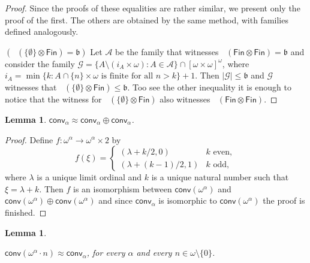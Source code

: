 \documentclass{amsart}
\theoremstyle{plain}
\newtheorem{lemma}[theorem]{Lemma}
\theoremstyle{definition}
\theoremstyle{remark}
\newcommand{\cA}{\mathcal{A}}
\newcommand{\cG}{\mathcal{G}}
\newcommand{\bnumber}{\mathfrak{b}}
\DeclareMathOperator{\add}{add}
\DeclareMathOperator{\addo}{\add^*_{\omega}}
\newcommand{\FIN}{\mathsf{Fin}}
\newcommand{\fin}{\FIN}
\newcommand{\conv}{\mathsf{conv}}
\begin{document}
\begin{proof}
   
    Since the proofs of these equalities are rather similar, we present only the proof of the first. The others are obtained by the same method, with families defined analogously.
    
   $(\addo(\{\emptyset\}\otimes\fin)= \bnumber)$ Let $\cA$ be the family that witnesses $\addo(\fin\otimes\fin)= \bnumber$ and consider the family $\cG=\{A\setminus (i_A\times \omega) : A\in\cA \}\cap [\omega\times \omega]^\omega$, where $i_A=\min\{k: A\cap \{n\}\times\omega \text{ is finite for all } n>k\}+1$. Then $|\cG|\leq \bnumber$ and $\cG$ witnesses that $\addo(\{\emptyset\}\otimes\fin)\leq \bnumber$. Too see the other inequality it is enough to notice that the witness for $\addo(\{\emptyset\}\otimes\fin)$ also witnesses $\addo(\fin\otimes\fin)$.
\end{proof}


\begin{lemma}\label{lem:baufa}
$\conv_\alpha\approx \conv_\alpha\oplus\conv_\alpha$.
\end{lemma}
\begin{proof}
Define $f:\omega^\alpha\to \omega^\alpha\times 2$ by 
    \begin{equation*}
f(\xi)=
\begin{cases}
(\lambda+k/2,0) & k \text{ even},\\
(\lambda+(k-1)/2,1) & k \text{ odd},
    \end{cases}
\end{equation*}
where 
 $\lambda$ is 
  a unique limit ordinal and $k$ is a unique natural number  such that $\xi=\lambda+k$. 
Then $f$ is an isomorphism between $\conv(\omega^\alpha)$ and $\conv(\omega^\alpha)\oplus\conv(\omega^\alpha)$ and since $\conv_\alpha$ is isomorphic to $\conv(\omega^\alpha)$ the proof is finished.
\end{proof}


\begin{lemma}\label{lem:bhafdu}
    
    $ \conv(\omega^\alpha\cdot n)\approx\conv_\alpha$, for every $\alpha$ and every $n\in\omega\setminus\{0\}$.
\end{lemma}
\end{document}
